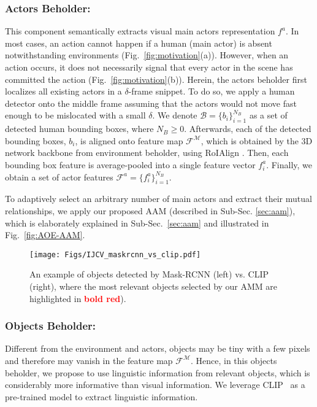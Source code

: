 \documentclass[sn-mathphys]{sn-jnl}
\theoremstyle{thmstyleone}\newtheorem{theorem}{Theorem}\newtheorem{proposition}[theorem]{Proposition}
\theoremstyle{thmstyletwo}\newtheorem{example}{Example}\newtheorem{remark}{Remark}
\theoremstyle{thmstylethree}\newtheorem{definition}{Definition}
\begin{document}
\subsubsection{Actors Beholder:}
\label{subsubsec:actors}
This component semantically extracts visual main actors representation $f^a$. In most cases, an action cannot happen if a human (main actor) is absent notwithstanding environments (Fig.~\ref{fig:motivation}(a)). However, when an action occurs, it does not necessarily signal that every actor in the scene has committed the action (Fig.~\ref{fig:motivation}(b)). Herein, the actors beholder first localizes all existing actors in a $\delta$-frame snippet. To do so, we apply a human detector onto the middle frame assuming that the actors would not move fast enough to be mislocated with a small $\delta$. We denote $\mathcal{B}=\{b_i\}_{i=1}^{N_B}$ as a set of detected human bounding boxes, where $N_B \geq 0$. Afterwards, each of the detected bounding boxes, $b_i$, is aligned onto feature map $\mathcal{F^M}$, which is obtained by the 3D network backbone from environment beholder, using RoIAlign \cite{MaskRCNN_ICCV17}. Then, each bounding box feature is average-pooled into a single feature vector $f^a_i$. Finally, we obtain a set of actor features $\mathcal{F}^a=\{f^a_i\}^{N_B}_{i=1}$.

To adaptively select an arbitrary number of main actors and extract their mutual relationships, we apply our proposed AAM (described in Sub-Sec. \ref{sec:aam}), which is elaborately explained in Sub-Sec.~\ref{sec:aam} and illustrated in Fig.~\ref{fig:AOE-AAM}.

\begin{figure}[!t]
    \centering
    \texttt{[image: Figs/IJCV\_maskrcnn\_vs\_clip.pdf]}
    \caption{An example of objects detected by Mask-RCNN \cite{MaskRCNN_ICCV17} (left) vs. CLIP (right), where the most relevant objects selected by our AMM are highlighted in \textbf{\textcolor{red}{bold red}}).}
    \label{fig:maskrcnn_vs_clip}
\end{figure}

\subsubsection{Objects Beholder:}
\label{subsubsec:objects}
Different from the environment and actors, objects may be tiny with a few pixels and therefore may vanish in the feature map $\mathcal{F}^\mathcal{M}$. Hence, in this objects beholder, we propose to use linguistic information from relevant objects, which is considerably more informative than visual information. We leverage CLIP~\cite{radford2021learning} as a pre-trained model to extract linguistic information.
\end{document}
